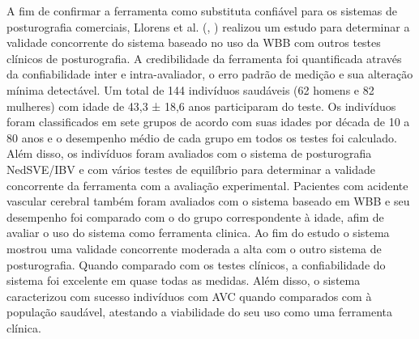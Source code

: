 A fim de confirmar a ferramenta como substituta confiável para os sistemas de posturografia comerciais, Llorens et al. (\citeauthor{llorens2016posturography}, \citeyear{llorens2016posturography}) realizou um estudo para determinar a validade concorrente do sistema baseado no uso da WBB com outros testes clínicos de posturografia. A credibilidade da ferramenta foi quantificada através da confiabilidade inter e intra-avaliador, o erro padrão de medição e sua alteração mínima detectável. Um total de 144 indivíduos saudáveis (62 homens e 82 mulheres) com idade de 43,3  ±  18,6 anos
participaram do teste.  Os indivíduos foram classificados em sete grupos de acordo com suas idades por década de 10 a 80 anos e o desempenho médio de cada grupo em todos os testes foi calculado. Além disso, os indivíduos foram avaliados com o sistema de posturografia NedSVE/IBV e com vários testes de equilíbrio para determinar a validade concorrente da ferramenta com a avaliação experimental. Pacientes com acidente vascular cerebral também foram avaliados com o sistema baseado em WBB e seu desempenho foi comparado com o do grupo correspondente à idade, afim de avaliar o uso do sistema como ferramenta clinica. Ao fim do estudo o sistema mostrou uma validade concorrente moderada a alta com o outro sistema de posturografia. Quando comparado com os testes clínicos, a confiabilidade do sistema foi excelente em quase todas as medidas. Além disso, o sistema caracterizou com sucesso indivíduos com AVC quando comparados com à população saudável, atestando a viabilidade do seu uso como uma ferramenta clínica.




